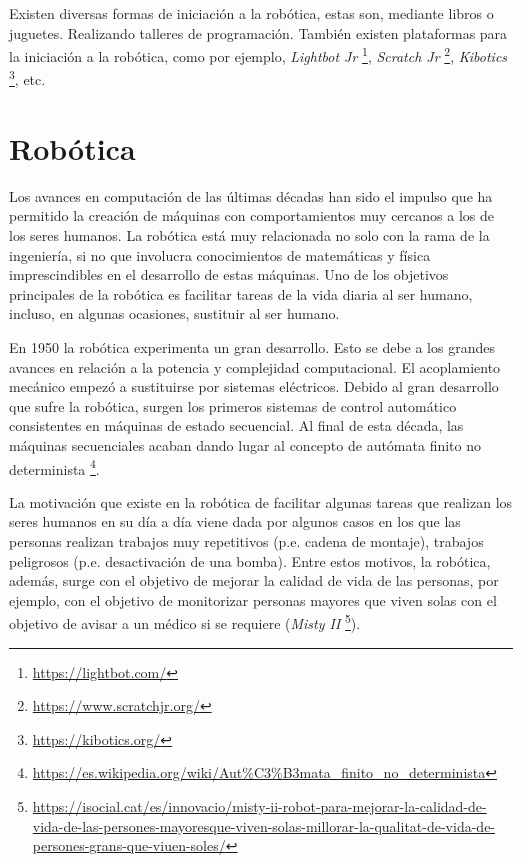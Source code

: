 \documentclass[a4paper, 12pt]{book}
\begin{document}
Existen diversas formas de iniciación a la robótica, estas son, mediante libros o juguetes. Realizando talleres de programación. También existen plataformas para la iniciación a la robótica, como por ejemplo, \emph{Lightbot Jr} \footnote{\url{https://lightbot.com/}}, \emph{Scratch Jr} \footnote{\url{https://www.scratchjr.org/}}, \emph{Kibotics} \footnote{\url{https://kibotics.org/}}, etc.

\section{Robótica}
\label{sec:robotica}


Los avances en computación de las últimas décadas han sido el impulso que ha permitido la creación de máquinas con comportamientos muy cercanos a los de los seres humanos. La robótica está muy relacionada no solo con la rama de la ingeniería, si no que involucra conocimientos de matemáticas y física imprescindibles en el desarrollo de estas máquinas. Uno de los objetivos principales de la robótica es facilitar tareas de la vida diaria al ser humano, incluso, en algunas ocasiones, sustituir al ser humano.

En 1950 la robótica experimenta un gran desarrollo. Esto se debe a los grandes avances en relación a la potencia y complejidad computacional. El acoplamiento mecánico empezó a sustituirse por sistemas eléctricos. Debido al gran desarrollo que sufre la robótica, surgen los primeros sistemas de control automático consistentes en máquinas de estado secuencial. Al final de esta década, las máquinas secuenciales acaban dando lugar al concepto de autómata finito no determinista \footnote{\url{https://es.wikipedia.org/wiki/Aut\%C3\%B3mata_finito_no_determinista}}.

La motivación que existe en la robótica de facilitar algunas tareas que realizan los seres humanos en su día a día viene dada por algunos casos en los que las personas realizan trabajos muy repetitivos (p.e. cadena de montaje), trabajos peligrosos (p.e. desactivación de una bomba). Entre estos motivos, la robótica, además, surge con el objetivo de mejorar la calidad de vida de las personas, por ejemplo, con el objetivo de monitorizar personas mayores que viven solas con el objetivo de avisar a un médico si se requiere (\emph{Misty II} \footnote{\url{https://isocial.cat/es/innovacio/misty-ii-robot-para-mejorar-la-calidad-de-vida-de-las-persones-mayoresque-viven-solas-millorar-la-qualitat-de-vida-de-persones-grans-que-viuen-soles/}}).
\end{document}
